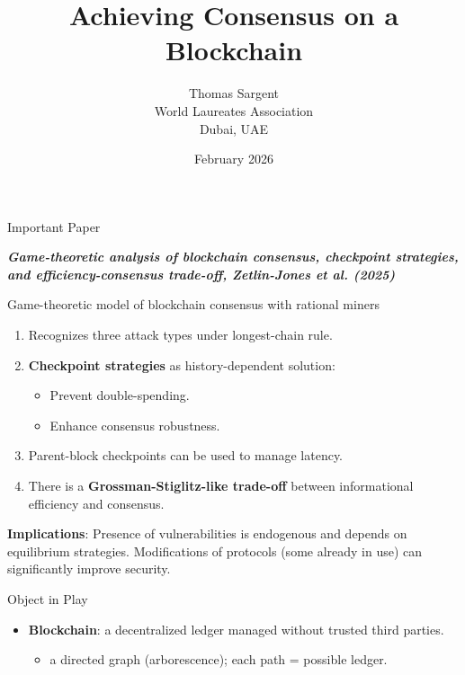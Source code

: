 \documentclass[aspectratio=169, 12pt]{beamer}
\title{Achieving Consensus on a Blockchain}
\author{Thomas Sargent \\
World Laureates Association \\
Dubai, UAE}
\date{February 2026}
\begin{document}
\titlepage

\begin{frame}{Important Paper}


\textbf{\em Game-theoretic analysis of blockchain consensus,
    checkpoint strategies, and  efficiency-consensus trade-off,
         Zetlin-Jones et al. (2025)}
         
\end{frame}

\begin{frame}{Game-theoretic model of blockchain consensus with rational miners }
    \begin{enumerate}
        \item Recognizes three attack types under longest-chain rule.
        \item \textbf{Checkpoint strategies} as history-dependent solution:
        \begin{itemize}
            \item Prevent double-spending.
            \item Enhance consensus robustness.
        \end{itemize}
        \item Parent-block checkpoints can be used to manage latency.
        \item There is a  \textbf{Grossman-Stiglitz-like trade-off}  between informational efficiency and consensus.
            \end{enumerate}
    
    \vspace{0.3cm}
    \textbf{Implications}: Presence of vulnerabilities is endogenous and  depends on equilibrium strategies. Modifications of protocols (some already in use) can significantly improve security.
\end{frame}



\begin{frame}{Object in Play}        

\begin{itemize}
        \item \textbf{Blockchain}: a decentralized ledger managed  without trusted third parties.
        \begin{itemize}
        \item a directed graph (arborescence); each path = possible ledger.
        \end{itemize}
\end{itemize}

\end{frame}
\end{document}
